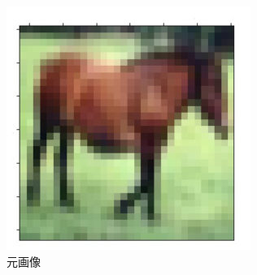 \documentclass[onecolumn]{ujarticle}   %
\begin{document}
    \begin{figure}[h]
  		\begin{center}
  			\includegraphics[width=0.3\columnwidth]{transform_test/horse.jpg}
  			\caption{元画像}
  			\label{fig:horse_original}
  		\end{center}
  	\end{figure}

    \begin{figure}[h]
      \vspace{-4mm}
      \centering


\end{figure}
\end{document}

